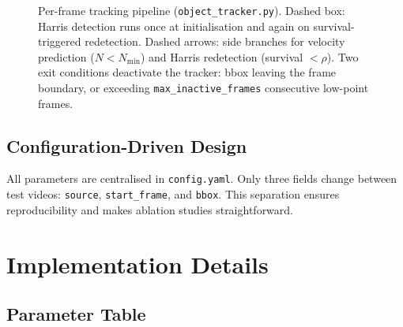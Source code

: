 \documentclass[12pt,a4paper]{article}
\begin{document}
\begin{figure}[H]
\caption{Per-frame tracking pipeline (\texttt{object\_tracker.py}). Dashed box: Harris detection
runs once at initialisation and again on survival-triggered redetection. Dashed arrows: side
branches for velocity prediction ($N < N_{\min}$) and Harris redetection (survival $< \rho$).
Two exit conditions deactivate the tracker: bbox leaving the frame boundary, or exceeding
\texttt{max\_inactive\_frames} consecutive low-point frames.}
\label{fig:pipeline}
\end{figure}

\subsection{Configuration-Driven Design}
All parameters are centralised in \texttt{config.yaml}. Only three fields change between test
videos: \texttt{source}, \texttt{start\_frame}, and \texttt{bbox}. This separation ensures
reproducibility and makes ablation studies straightforward.

\section{Implementation Details}

\subsection{Parameter Table}
\end{document}
